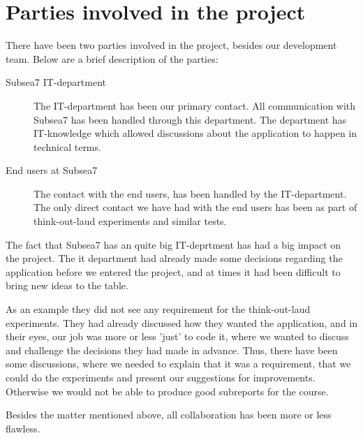 \section{Parties involved in the project}
There have been two parties involved in the project, besides our development team. Below are a brief description of the parties:

\begin{description}
    \item [Subsea7 IT-department] 
        The IT-department has been our primary contact. All communication with 
        Subsea7 has been handled through this department. The department has 
        IT-knowledge which allowed discussions about the application to happen 
        in technical terms.   

    \item [End users at Subsea7]
        The contact with the end users, has been handled by the IT-department. 
        The only direct contact we have had with the end users has been as 
        part of think-out-laud experiments and similar tests.
\end{description}

The fact that Subsea7 has an quite big  IT-deprtment has had a big impact on the project. 
The it department had already made some decisions regarding the application 
before we entered the project, and at times it had been
difficult to bring new ideas to the table. 

As an example they did not see any requirement for the think-out-laud experiments.
They had already discussed how they wanted the application, and in their eyes, our
job was more or less 'just' to code it, where we wanted to discuss and challenge the decisions they had made in advance. Thus, there have been some discussions, where we needed
to explain that it was a requirement, that we could do the experiments
and present our suggestions for improvements. Otherwise we would not be able to 
produce good subreports for the course.

Besides the matter mentioned above, all collaboration has been more or less flawless.
